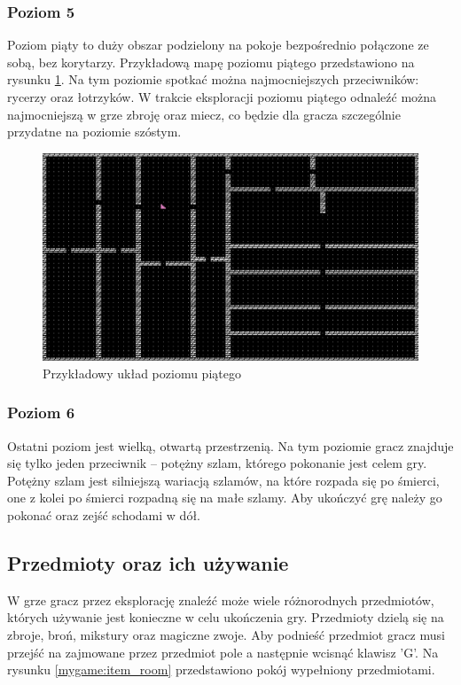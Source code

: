 \documentclass[12pt,twoside]{article}
\begin{document}
\subsubsection{Poziom 5}
Poziom piąty to duży obszar podzielony na pokoje bezpośrednio połączone ze sobą, bez korytarzy. Przykładową mapę poziomu piątego przedstawiono na rysunku \ref{mygame:map5}. Na tym poziomie spotkać można najmocniejszych przeciwników: rycerzy oraz łotrzyków. W trakcie eksploracji poziomu piątego odnaleźć można najmocniejszą w grze zbroję oraz miecz, co będzie dla gracza szczególnie przydatne na poziomie szóstym.

\FloatBarrier
\begin{figure}[ht]
	\centering
	\includegraphics[width=14cm]{images/mygame/map5.png}
	\caption{Przykładowy układ poziomu piątego}
	\label{mygame:map5}
\end{figure}
\FloatBarrier


\subsubsection{Poziom 6}
Ostatni poziom jest wielką, otwartą przestrzenią. Na tym poziomie gracz znajduje się tylko jeden przeciwnik -- potężny szlam, którego pokonanie jest celem gry. Potężny szlam jest silniejszą wariacją szlamów, na które rozpada się po śmierci, one z kolei po śmierci rozpadną się na małe szlamy. Aby ukończyć grę należy go pokonać oraz zejść schodami w dół.


\subsection{Przedmioty oraz ich używanie}
W grze gracz przez eksplorację znaleźć może wiele różnorodnych przedmiotów, których używanie jest konieczne w celu ukończenia gry. Przedmioty dzielą się na zbroje, broń, mikstury oraz magiczne zwoje. Aby podnieść przedmiot gracz musi przejść na zajmowane przez przedmiot pole a następnie wcisnąć klawisz 'G'. Na rysunku \ref{mygame:item_room} przedstawiono pokój wypełniony przedmiotami.
\end{document}

